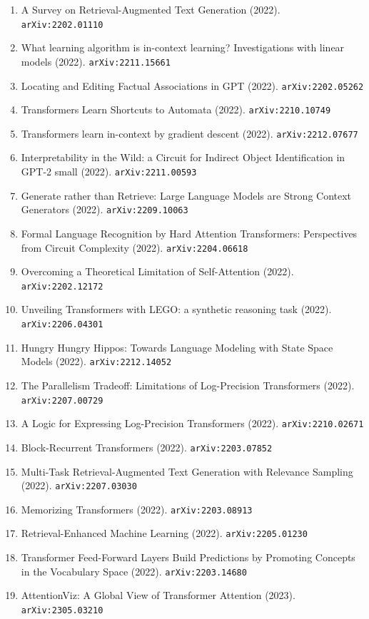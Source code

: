 \documentclass[11pt]{article}
\begin{document}
\begin{enumerate}
  \item A Survey on Retrieval-Augmented Text Generation (2022). \texttt{arXiv:2202.01110}
  \item What learning algorithm is in-context learning? Investigations with
  linear models (2022). \texttt{arXiv:2211.15661}
  \item Locating and Editing Factual Associations in GPT (2022). \texttt{arXiv:2202.05262}
  \item Transformers Learn Shortcuts to Automata (2022). \texttt{arXiv:2210.10749}
  \item Transformers learn in-context by gradient descent (2022). \texttt{arXiv:2212.07677}
  \item Interpretability in the Wild: a Circuit for Indirect Object
  Identification in GPT-2 small (2022). \texttt{arXiv:2211.00593}
  \item Generate rather than Retrieve: Large Language Models are Strong Context
  Generators (2022). \texttt{arXiv:2209.10063}
  \item Formal Language Recognition by Hard Attention Transformers: Perspectives
  from Circuit Complexity (2022). \texttt{arXiv:2204.06618}
  \item Overcoming a Theoretical Limitation of Self-Attention (2022). \texttt{arXiv:2202.12172}
  \item Unveiling Transformers with LEGO: a synthetic reasoning task (2022). \texttt{arXiv:2206.04301}
  \item Hungry Hungry Hippos: Towards Language Modeling with State Space Models (2022). \texttt{arXiv:2212.14052}
  \item The Parallelism Tradeoff: Limitations of Log-Precision Transformers (2022). \texttt{arXiv:2207.00729}
  \item A Logic for Expressing Log-Precision Transformers (2022). \texttt{arXiv:2210.02671}
  \item Block-Recurrent Transformers (2022). \texttt{arXiv:2203.07852}
  \item Multi-Task Retrieval-Augmented Text Generation with Relevance Sampling (2022). \texttt{arXiv:2207.03030}
  \item Memorizing Transformers (2022). \texttt{arXiv:2203.08913}
  \item Retrieval-Enhanced Machine Learning (2022). \texttt{arXiv:2205.01230}
  \item Transformer Feed-Forward Layers Build Predictions by Promoting Concepts
  in the Vocabulary Space (2022). \texttt{arXiv:2203.14680}
  \item AttentionViz: A Global View of Transformer Attention (2023). \texttt{arXiv:2305.03210}

\end{enumerate}
\end{document}
